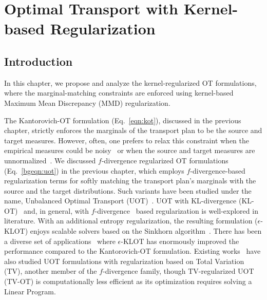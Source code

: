 \chapter{Optimal Transport with Kernel-based Regularization}
\label{chap:ch1}

\section{Introduction}\label{sec:intro}
In this chapter, we propose and analyze the kernel-regularized OT formulations, where the marginal-matching constraints are enforced using kernel-based Maximum Mean Discrepancy (MMD) regularization.

The Kantorovich-OT formulation (Eq.~\ref{eqn:kot}), discussed in the previous chapter, strictly enforces the marginals of the transport plan to be the source and target measures. However, often, one prefers to relax this constraint when the empirical measures could be noisy~\citep{ROT} or when the source and target measures are unnormalized~\citep{chizat17,Liero2018}. We discussed $f$-divergence regularized OT formulations (Eq.~\ref{bgeqn:uot}) in the previous chapter, which employs $f$-divergence-based regularization terms for softly matching the transport plan's marginals with the source and the target distributions. Such variants have been studied under the name, Unbalanced Optimal Transport (UOT)~\citep{chizat17}.
UOT with KL-divergence (KL-OT)~\citep{Liero2016OptimalTI,Liero2018} and, in general, with $f$-divergence~\citep{Csiszar67} based regularization is well-explored in literature. 
With an additional entropy regularization, the resulting formulation ($\epsilon$-KLOT) enjoys scalable solvers based on the Sinkhorn algorithm~\citep{ChizatPSV18,chizat18a}. There has been a diverse set of applications~\citep{jumbot,ijcai2020p516,De_Plaen_2023_CVPR} where $\epsilon$-KLOT has enormously improved the performance compared to the Kantorovich-OT formulation.
Existing works~\citep{Piccoli2014GeneralizedWD,pic2016,tvdual,4689383} have also studied UOT formulations with regularization based on Total Variation (TV), another member of the $f$-divergence family, though TV-regularized UOT (TV-OT) is computationally less efficient as its optimization requires solving a Linear Program.

